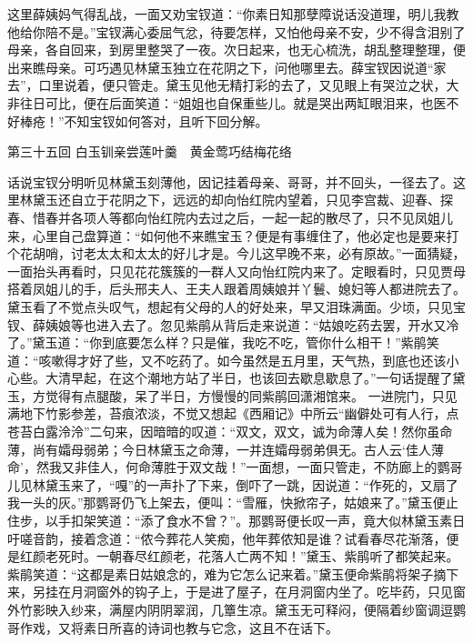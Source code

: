 \documentclass[12pt,oneside]{book}
\begin{document}
这里薛姨妈气得乱战，一面又劝宝钗道：“你素日知那孽障说话没道理，明儿我教他给你陪不是。”宝钗满心委屈气忿，待要怎样，又怕他母亲不安，少不得含泪别了母亲，各自回来，到房里整哭了一夜。次日起来，也无心梳洗，胡乱整理整理，便出来瞧母亲。可巧遇见林黛玉独立在花阴之下，问他哪里去。薛宝钗因说道“家去”，口里说着，便只管走。黛玉见他无精打彩的去了，又见眼上有哭泣之状，大非往日可比，便在后面笑道：“姐姐也自保重些儿。就是哭出两缸眼泪来，也医不好棒疮！”不知宝钗如何答对，且听下回分解。



 
第三十五回  白玉钏亲尝莲叶羹　黄金莺巧结梅花络


话说宝钗分明听见林黛玉刻薄他，因记挂着母亲、哥哥，并不回头，一径去了。这里林黛玉还自立于花阴之下，远远的却向怡红院内望着，只见李宫裁、迎春、探春、惜春并各项人等都向怡红院内去过之后，一起一起的散尽了，只不见凤姐儿来，心里自己盘算道：“如何他不来瞧宝玉？便是有事缠住了，他必定也是要来打个花胡哨，讨老太太和太太的好儿才是。今儿这早晚不来，必有原故。”一面猜疑，一面抬头再看时，只见花花簇簇的一群人又向怡红院内来了。定眼看时，只见贾母搭着凤姐儿的手，后头邢夫人、王夫人跟着周姨娘并丫鬟、媳妇等人都进院去了。黛玉看了不觉点头叹气，想起有父母的人的好处来，早又泪珠满面。少顷，只见宝钗、薛姨娘等也进入去了。忽见紫鹃从背后走来说道：“姑娘吃药去罢，开水又冷了。”黛玉道：“你到底要怎么样？只是催，我吃不吃，管你什么相干！”紫鹃笑道：“咳嗽得才好了些，又不吃药了。如今虽然是五月里，天气热，到底也还该小心些。大清早起，在这个潮地方站了半日，也该回去歇息歇息了。”一句话提醒了黛玉，方觉得有点腿酸，呆了半日，方慢慢的同紫鹃回潇湘馆来。
一进院门，只见满地下竹影参差，苔痕浓淡，不觉又想起《西厢记》中所云“幽僻处可有人行，点苍苔白露泠泠”二句来，因暗暗的叹道：“双文，双文，诚为命薄人矣！然你虽命薄，尚有孀母弱弟；今日林黛玉之命薄，一并连孀母弱弟俱无。古人云‘佳人薄命’，然我又非佳人，何命薄胜于双文哉！”一面想，一面只管走，不防廊上的鹦哥儿见林黛玉来了，“嘎”的一声扑了下来，倒吓了一跳，因说道：“作死的，又扇了我一头的灰。”那鹦哥仍飞上架去，便叫：“雪雁，快掀帘子，姑娘来了。”黛玉便止住步，以手扣架笑道：“添了食水不曾？”。那鹦哥便长叹一声，竟大似林黛玉素日吁嗟音韵，接着念道：“侬今葬花人笑痴，他年葬侬知是谁？试看春尽花渐落，便是红颜老死时。一朝春尽红颜老，花落人亡两不知！”黛玉、紫鹃听了都笑起来。紫鹃笑道：“这都是素日姑娘念的，难为它怎么记来着。”黛玉便命紫鹃将架子摘下来，另挂在月洞窗外的钩子上，于是进了屋子，在月洞窗内坐了。吃毕药，只见窗外竹影映入纱来，满屋内阴阴翠润，几簟生凉。黛玉无可释闷，便隔着纱窗调逗鹦哥作戏，又将素日所喜的诗词也教与它念，这且不在话下。
\end{document}
